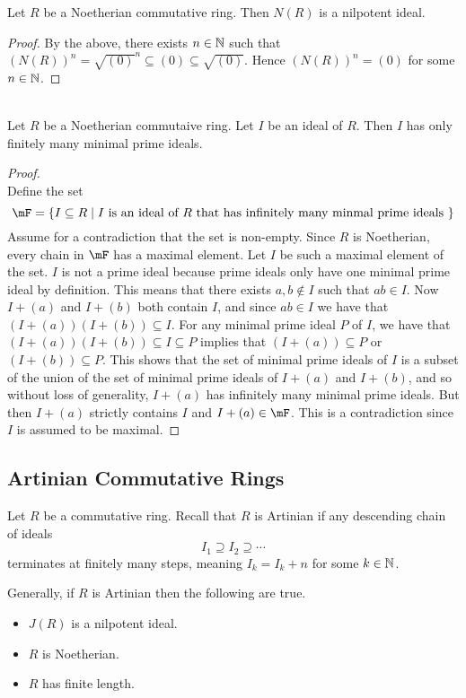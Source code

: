\documentclass[a4paper]{article}
\begin{document}
\begin{prp}{}{} Let $R$ be a Noetherian commutative ring. Then $N(R)$ is a nilpotent ideal. 
\begin{proof}
By the above, there exists $n\in\mathbb{N}$ such that $(N(R))^n=\sqrt{(0)}^n\subseteq (0)\subseteq\sqrt{(0)}$. Hence $(N(R))^n=(0)$ for some $n\in\mathbb{N}$. 
\end{proof}
\end{prp}

\begin{prp}{}{}\\
Let $R$ be a Noetherian commutaive ring. Let $I$ be an ideal of $R$. Then $I$ has only finitely many minimal prime ideals. 
\begin{proof}\\
Define the set $$\mF=\{I\subseteq R\;|\;I\text{ is an ideal of }R\text{ that has infinitely many minmal prime ideals }\}$$ Assume for a contradiction that the set is non-empty. Since $R$ is Noetherian, every chain in $\mF$ has a maximal element. Let $I$ be such a maximal element of the set. $I$ is not a prime ideal because prime ideals only have one minimal prime ideal by definition. This means that there exists $a,b\notin I$ such that $ab\in I$. Now $I+(a)$ and $I+(b)$ both contain $I$, and since $ab\in I$ we have that $(I+(a))(I+(b))\subseteq I$. For any minimal prime ideal $P$ of $I$, we have that $(I+(a))(I+(b))\subseteq I\subseteq P$ implies that $(I+(a))\subseteq P$ or $(I+(b))\subseteq P$. This shows that the set of minimal prime ideals of $I$ is a subset of the union of the set of minimal prime ideals of $I+(a)$ and $I+(b)$, and so without loss of generality, $I+(a)$ has infinitely many minimal prime ideals. But then $I+(a)$ strictly contains $I$ and $I+(a)\in\mF$. This is a contradiction since $I$ is assumed to be maximal. 
\end{proof}
\end{prp}

\subsection{Artinian Commutative Rings}
Let $R$ be a commutative ring. Recall that $R$ is Artinian if any descending chain of ideals $$I_1\supseteq I_2\supseteq\cdots$$ terminates at finitely many steps, meaning $I_k=I_k+n$ for some $k\in\mathbb{N}$. 

Generally, if $R$ is Artinian then the following are true. 
\begin{itemize}
\item $J(R)$ is a nilpotent ideal. 
\item $R$ is Noetherian. 
\item $R$ has finite length. 
\end{itemize}
\end{document}
